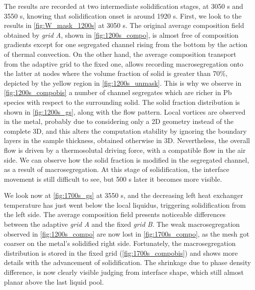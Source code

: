 The results are recorded at two intermediate solidification stages, at 3050 s and 3550 s, knowing that solidification onset is around 1920 s.
First, we look to the results in \cref{fig:W_mask_1200s} at 3050 s. The original average composition field obtained by \emph{grid A}, shown in \cref{fig:1200s_compo},
is almost free of composition gradients except for one segregated channel rising from the bottom by the action of thermal convection.
On the other hand, the average composition transport from the adaptive grid to the fixed one, allows recording macrosegregation onto the latter
at nodes where the volume fraction of solid is greater than 70\%, depicted by the yellow region in \cref{fig:1200s_unmask}. 
This is why we observe in \cref{fig:1200s_compobis} a number of channel segregates
which are richer in Pb species with respect to the surrounding solid.
The solid fraction distribution is shown in \cref{fig:1200s_gs}, along with the flow pattern. Local vortices are observed in the metal, probably due 
to considering only a 2D geometry instead of the complete 3D, and this alters the computation stability by ignoring the boundary layers in the sample 
thickness, obtained otherwise in 3D. Nevertheless, the overall 
flow is driven by a thermosolutal driving force, with a compatible flow in the air side. 
We can observe how the solid fraction is modified in the segregated channel, as a result of macrosegregation.
At this stage of solidification, the interface movement is still difficult to see, but 500 s later it becomes more visible.


We look now at \cref{fig:1700s_gs} at 3550 s, and the decreasing left heat exchanger temperature has just went below the local liquidus, 
triggering solidification from the left side.
The average composition field presents noticeable differences between the adaptive \emph{grid A} and the fixed \emph{grid B}.
The weak macrosegregation observed in \cref{fig:1200s_compo} are now lost in \cref{fig:1700s_compo}, as the mesh got coarser on the metal's solidified right
side. Fortunately, the macrosegregation distribution is stored in the fixed grid (\cref{fig:1700s_compobis}) and shows more details with the advancement of solidification. 
The shrinkage due to phase density difference, is now clearly visible judging from interface shape, which still almost planar above the last liquid pool. 

